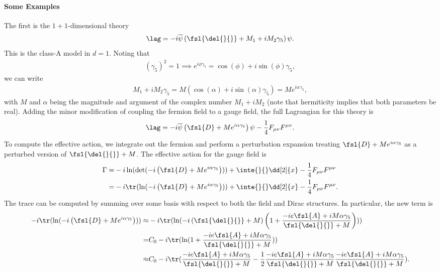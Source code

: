 \paragraph{Some Examples}
The first is the $1 + 1$-dimensional theory
\begin{align*}
	\lag = -i\overline{\psi}\left(\fsl{\del{}{}} + M_{1} + iM_{2}\gamma_{5}\right)\psi.
\end{align*}
This is the class-A model in $d = 1$. Noting that
\begin{align*}
	(\gamma_{5})^{2} = 1 \implies e^{i\phi\gamma_{5}} = \cos(\phi) + i\sin(\phi)\gamma_{5},
\end{align*}
we can write
\begin{align*}
	M_{1} + iM_{2}\gamma_{5} = M\left(\cos(\alpha) + i\sin(\alpha)\gamma_{5}\right) = Me^{i\alpha\gamma_{5}},
\end{align*}
with $M$ and $\alpha$ being the magnitude and argument of the complex number $M_{1} + iM_{2}$ (note that hermiticity implies that both parameters be real). Adding the minor modification of coupling the fermion field to a gauge field, the full Lagrangian for this theory is
\begin{align*}
	\lag = -i\overline{\psi}\left(\fsl{D} + Me^{i\alpha\gamma_{5}}\right)\psi - \frac{1}{4}F_{\mu\nu}F^{\mu\nu}.
\end{align*}
To compute the effective action, we integrate out the fermion and perform a perturbation expansion treating $\fsl{D} + Me^{i\alpha\gamma_{5}}$ as a perturbed version of $\fsl{\del{}{}} + M$. The effective action for the gauge field is
\begin{align*}
	\Gamma =& -i\ln(\det(-i\left(\fsl{D} + Me^{i\alpha\gamma_{5}}\right))) + \inte{}{}\dd[2]{x}-\frac{1}{4}F_{\mu\nu}F^{\mu\nu} \\
	       =& -i\tr(\ln(-i\left(\fsl{D} + Me^{i\alpha\gamma_{5}}\right))) + \inte{}{}\dd[2]{x}-\frac{1}{4}F_{\mu\nu}F^{\mu\nu}.
\end{align*}
The trace can be computed by summing over some basis with respect to both the field and Dirac structures. In particular, the new term is
\begin{align*}
	-i\tr(\ln(-i\left(\fsl{D} + Me^{i\alpha\gamma_{5}}\right))) \approx& 	-i\tr(\ln(-i\left(\fsl{\del{}{}} + M\right)\left(1 + \frac{-ie\fsl{A} + iM\alpha\gamma_{5}}{\fsl{\del{}{}} + M}\right))) \\
	=& C_{0} - i\tr(\ln(1 + \frac{-ie\fsl{A} + iM\alpha\gamma_{5}}{\fsl{\del{}{}} + M})) \\
	\approx& C_{0} - i\tr(\frac{-ie\fsl{A} + iM\alpha\gamma_{5}}{\fsl{\del{}{}} + M} - \frac{1}{2}\frac{-ie\fsl{A} + iM\alpha\gamma_{5}}{\fsl{\del{}{}} + M}\frac{-ie\fsl{A} + iM\alpha\gamma_{5}}{\fsl{\del{}{}} + M}).
\end{align*}
